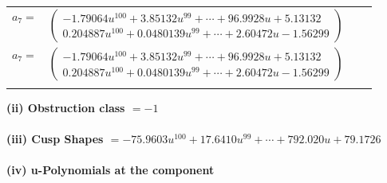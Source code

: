 \documentclass[1p]{elsarticle_modified}
\theoremstyle{definition}
\begin{document}
\begin{tabular}{m{7pt} m{180pt} m{7pt} m{180pt} }
\flushright $a_{7}=$&$\begin{pmatrix}-1.79064 u^{100}+3.85132 u^{99}+\cdots+96.9928 u+5.13132\\0.204887 u^{100}+0.0480139 u^{99}+\cdots+2.60472 u-1.56299\end{pmatrix}$\\ \flushright $a_{7}=$&$\begin{pmatrix}-1.79064 u^{100}+3.85132 u^{99}+\cdots+96.9928 u+5.13132\\0.204887 u^{100}+0.0480139 u^{99}+\cdots+2.60472 u-1.56299\end{pmatrix}$\\&\end{tabular}
\flushleft \textbf{(ii) Obstruction class $= -1$}\\~\\
\flushleft \textbf{(iii) Cusp Shapes $= -75.9603 u^{100}+17.6410 u^{99}+\cdots+792.020 u+79.1726$}\\~\\
\newpage\renewcommand{\arraystretch}{1}
\flushleft \textbf{(iv) u-Polynomials at the component}\newline \\
\end{document}
